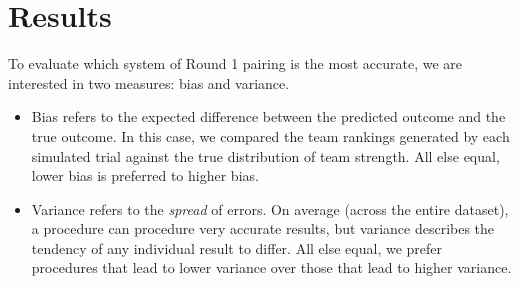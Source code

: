 \documentclass{tufte-handout}
\begin{document}
\section{Results}

To evaluate which system of Round 1 pairing is the most accurate, we are interested in two measures: bias and variance.

\begin{itemize}
\item Bias refers to the expected difference between the predicted outcome and the true outcome. In this case, we compared the team rankings generated by each simulated trial against the true distribution of team strength. All else equal, lower bias is preferred to higher bias. 
\item  Variance refers to the \emph{spread} of errors. On average (across the entire dataset), a procedure can procedure very accurate results, but variance describes the tendency of any individual result to differ. All else equal, we prefer procedures that lead to lower variance over those that lead to higher variance.
\end{itemize}
\end{document}
